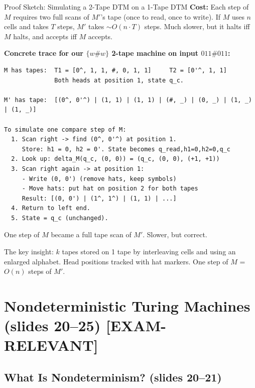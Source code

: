 \documentclass[11pt,a4paper]{article}
\newcommand{\kemark}{\textcolor{red!70!black}{\textbf{[EXAM-RELEVANT]}}}
\newcommand{\kt}[1]{\par\vspace{0.3em}\colorbox{yellow!60}{\parbox{\dimexpr\linewidth-2\fboxsep}{#1}}\vspace{0.3em}}
\begin{document}
\begin{examplebox}{{Proof Sketch: Simulating a 2-Tape DTM on a 1-Tape DTM}}
\textbf{Cost:} Each step of $M$ requires two full scans of $M'$'s tape (once to read, once to write). If $M$ uses $n$ cells and takes $T$ steps, $M'$ takes $\sim O(n \cdot T)$ steps. Much slower, but it halts iff $M$ halts, and accepts iff $M$ accepts.

\textbf{Concrete trace for our $\{w\#w\}$ 2-tape machine on input $011\#011$:}

\begin{lstlisting}
M has tapes:  T1 = [0^, 1, 1, #, 0, 1, 1]     T2 = [0'^, 1, 1]
              Both heads at position 1, state q_c.

M' has tape:  [(0^, 0'^) | (1, 1) | (1, 1) | (#, _) | (0, _) | (1, _) | (1, _)]

To simulate one compare step of M:
  1. Scan right -> find (0^, 0'^) at position 1.
     Store: h1 = 0, h2 = 0'. State becomes q_read,h1=0,h2=0,q_c
  2. Look up: delta_M(q_c, (0, 0)) = (q_c, (0, 0), (+1, +1))
  3. Scan right again -> at position 1:
     - Write (0, 0') (remove hats, keep symbols)
     - Move hats: put hat on position 2 for both tapes
     Result: [(0, 0') | (1^, 1^) | (1, 1) | ...]
  4. Return to left end.
  5. State = q_c (unchanged).
\end{lstlisting}

One step of $M$ became a full tape scan of $M'$. Slower, but correct.

\kt{The key insight: $k$ tapes stored on 1 tape by interleaving cells and using an enlarged alphabet. Head positions tracked with hat markers. One step of $M$ = $O(n)$ steps of $M'$.}
\end{examplebox}


\newpage
\section{Nondeterministic Turing Machines (slides 20--25) \kemark}

\subsection{What Is Nondeterminism? (slides 20--21)}
\end{document}
